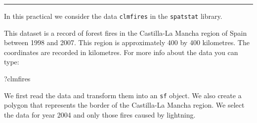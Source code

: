 \documentclass[
  letterpaper,
  DIV=11,
  numbers=noendperiod]{scrartcl}
\newenvironment{Shaded}{\begin{snugshade}}{\end{snugshade}}
\newcommand{\NormalTok}[1]{\textcolor[rgb]{0.00,0.23,0.31}{#1}}
\begin{document}
\begin{center}\rule{0.5\linewidth}{0.5pt}\end{center}

In this practical we consider the data \texttt{clmfires} in the
\texttt{spatstat} library.

This dataset is a record of forest fires in the Castilla-La Mancha
region of Spain between 1998 and 2007. This region is approximately 400
by 400 kilometres. The coordinates are recorded in kilometres. For more
info about the data you can type:

\begin{Shaded}
\begin{Highlighting}[]
\NormalTok{?clmfires}
\end{Highlighting}
\end{Shaded}

We first read the data and transform them into an \texttt{sf} object. We
also create a polygon that represents the border of the Castilla-La
Mancha region. We select the data for year 2004 and only those fires
caused by lightning.
\end{document}
